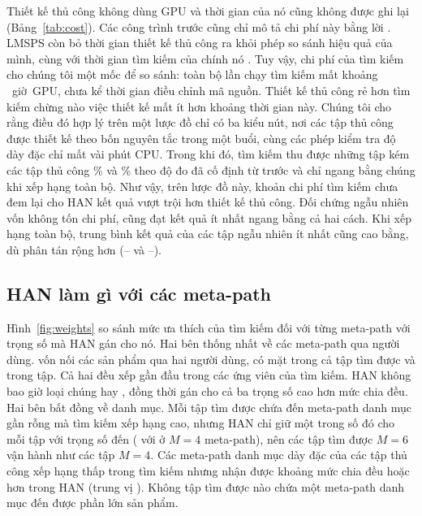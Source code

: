 Thiết kế thủ công không dùng GPU và thời gian của nó cũng không được ghi lại (Bảng~\ref{tab:cost}).
Các công trình trước cũng chỉ mô tả chi phí này bằng lời \citep[][Phụ lục~D]{han2020genetic,li2024longrange}.
LMSPS còn bỏ thời gian thiết kế thủ công ra khỏi phép so sánh hiệu quả của mình, cùng với thời gian
tìm kiếm của chính nó \citep[Phụ lục~E.1]{li2024longrange}. Tuy vậy, chi phí của tìm kiếm cho chúng
tôi một mốc để so sánh: toàn bộ  lần chạy tìm kiếm mất khoảng
~giờ~GPU, chưa kể thời gian điều chỉnh mã nguồn. Thiết kế thủ công rẻ hơn tìm
kiếm chừng nào việc thiết kế mất ít hơn khoảng thời gian này. Chúng tôi cho rằng điều đó hợp lý trên
một lược đồ chỉ có ba kiểu nút, nơi các tập thủ công được thiết kế theo bốn nguyên tắc trong một
buổi, cùng các phép kiểm tra độ dày đặc chỉ mất vài phút CPU. Trong khi đó, tìm kiếm thu được những
tập kém các tập thủ công \% và \% theo độ đo đã cố định
từ trước và chỉ ngang bằng chúng khi xếp hạng toàn bộ. Như vậy, trên lược đồ này, khoản chi phí tìm
kiếm chưa đem lại cho HAN kết quả vượt trội hơn thiết kế thủ công. Đối chứng ngẫu nhiên vốn không
tốn chi phí, cũng đạt kết quả ít nhất ngang bằng cả hai cách. Khi xếp hạng toàn bộ, trung bình kết
quả của các tập ngẫu nhiên ít nhất cũng cao bằng, dù phân tán rộng hơn
(-- và --).



\subsection{HAN làm gì với các meta-path}
\label{sec:res-weights}

Hình~\ref{fig:weights} so sánh mức ưa thích của tìm kiếm đối với từng meta-path với trọng số mà
HAN gán cho nó. Hai bên thống nhất về các meta-path qua người dùng.  vốn nối các sản
phẩm qua hai người dùng, có mặt trong cả  tập tìm được và 
trong  tập. Cả hai đều xếp gần đầu trong các ứng viên của tìm kiếm.
HAN không bao giờ loại chúng hay , đồng thời gán cho cả ba trọng số cao hơn mức chia
đều. Hai bên bất đồng về danh mục. Mỗi tập tìm được chứa  đến
 meta-path danh mục gần rỗng mà tìm kiếm xếp hạng cao, nhưng HAN chỉ giữ
một trong số đó cho mỗi tập với trọng số  đến 
( với  ở $M = 4$ meta-path), nên các tập tìm được $M = 6$ vận hành
như các tập $M = 4$. Các meta-path danh mục dày đặc của các tập thủ công xếp hạng thấp trong
tìm kiếm nhưng nhận được khoảng mức chia đều hoặc hơn trong HAN (trung vị ).
Không tập tìm được nào chứa một meta-path danh mục đến được phần lớn sản phẩm.

